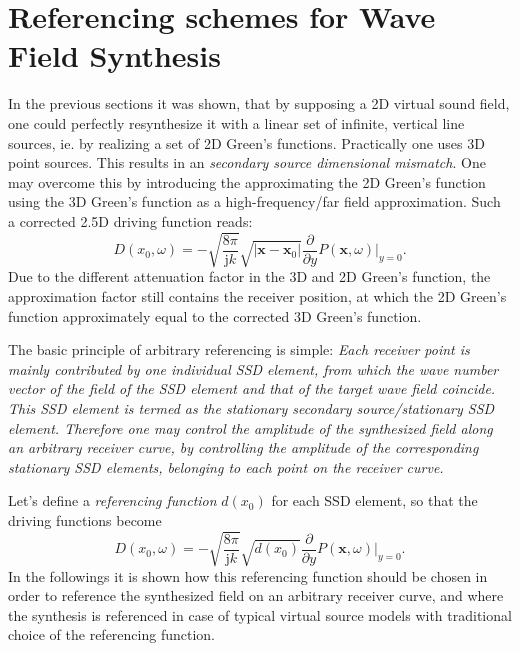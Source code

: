 \documentclass[12pt,a4paper]{article}
\newcommand{\ti}{\mathrm{j}}
\newcommand{\vx}{\mathbf{x}}
\newcommand{\vxo}{\mathbf{x}_0}
\begin{document}
\section{Referencing schemes for Wave Field Synthesis}

In the previous sections it was shown, that by supposing a 2D virtual sound field, one could perfectly resynthesize it with a linear set of infinite, vertical line sources, ie. by realizing a set of 2D Green's functions. Practically one uses 3D point sources. This results in an \emph{secondary source dimensional mismatch}. One may overcome this by introducing the approximating the 2D Green's function using the 3D Green's function as a high-frequency/far field approximation. Such a corrected 2.5D driving function reads:
\begin{equation}
D(x_0,\omega) = 
- \sqrt{\frac{8\pi}{\ti k}} \sqrt{|\vx-\vxo|} \frac{\partial}{\partial y} \left. P(\vx,\omega) \right|_{y = 0}.
\label{Eq:Gen_rayleigh_x_x0}
\end{equation}
Due to the different attenuation factor in the 3D and 2D Green's function, the approximation factor still contains the receiver position, at which the 2D Green's function approximately equal to the corrected 3D Green's function. 

The basic principle of arbitrary referencing is simple:
\emph{Each receiver point is mainly contributed by one individual SSD element, from which the wave number vector of the field of the SSD element and that of the target wave field coincide. This SSD element is termed as the stationary secondary source/stationary SSD element.
Therefore one may control the amplitude of the synthesized field along an arbitrary receiver curve, by controlling the amplitude of the corresponding stationary SSD elements, belonging to each point on the receiver curve.}
 
\vspace{3mm}
Let's define a \emph{referencing function} $d(x_0)$ for each SSD element, so that the driving functions become
\begin{equation}
D(x_0,\omega) = 
- \sqrt{\frac{8\pi}{\ti k}} \sqrt{d(x_0)} \frac{\partial}{\partial y} \left. P(\vx,\omega) \right|_{y = 0}.
\label{Eq:Gen_rayleigh_dx0}
\end{equation}
In the followings it is shown how this referencing function should be chosen in order to reference the synthesized field on an arbitrary receiver curve, and where the synthesis is referenced in case of typical virtual source models with traditional choice of the referencing function.
\end{document}
